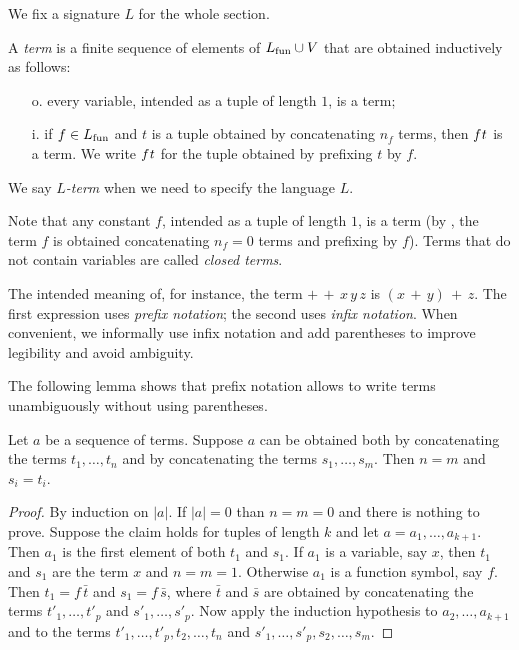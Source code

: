 We fix a signature $L$ for the whole section.

\begin{definition}\label{deftermine} 
A \emph{term\/} is a finite sequence of elements of $L_{\rm fun}\cup V$ that are obtained inductively as follows:
\begin{itemize}
\item[o.] every variable, intended as a tuple of length $1$, is a term;
\item[i.] if $f\in L_{\rm fun}$ and $t$ is a tuple obtained by concatenating $n_f$ terms, then $f\kern0.1ex t$ is a term. We write $f\kern0.1ex t$ for the tuple obtained by prefixing $t$ by $f$.
\end{itemize}
We say \emph{$L$-term\/} when we need to specify the language $L$.\QED
\end{definition}

Note that any constant $f$, intended as a tuple of length $1$, is a term (by , the term $f$ is obtained concatenating $n_f=0$ terms and prefixing by $f$). Terms that do not contain variables are called \emph{closed terms}.

The intended meaning of, for instance, the term ${+}\,{+}\,x\,y\,z$ is $(x\,{+}\,y)\,{+}\,z$. The first expression uses \emph{prefix notation\/}; the second uses \emph{infix notation}. When convenient, we informally use infix notation and add parentheses to improve legibility and avoid ambiguity.

The following lemma shows that prefix notation allows to write terms unambiguously without using parentheses.

\begin{lemma}\label{lemmaterminileggibilita}
Let $a$ be a sequence of terms. Suppose $a$ can be obtained both by concatenating the terms $t_1,\dots,t_n$ and by concatenating the terms $s_1,\dots,s_m$. Then $n=m$ and $s_i=t_i$.
\end{lemma}
\begin{proof}
By induction on $|a|$. If $|a|=0$ than $n=m=0$ and there is nothing to prove. Suppose the claim holds for tuples of length $k$ and let $a=a_1,\dots,a_{k+1}$. Then $a_1$ is the first element of both  $t_1$ and $s_1$. If $a_1$ is a variable, say $x$, then $t_1$ and $s_1$ are the term $x$ and $n=m=1$. Otherwise $a_1$ is a function symbol, say $f$. Then $t_1=f\,\bar t$ and $s_1=f\,\bar s$, where $\bar t$ and $\bar s$ are obtained by concatenating the terms $t'_1, \dots, t'_p$ and $s'_1, \dots, s'_p$.  Now apply the induction hypothesis to $a_2,\dots,a_{k+1}$ and to the terms $t'_1, \dots,t'_p,t_2,\dots,t_n$ and $s'_1,\dots,s'_p,s_2,\dots,s_m$.
\end{proof}

